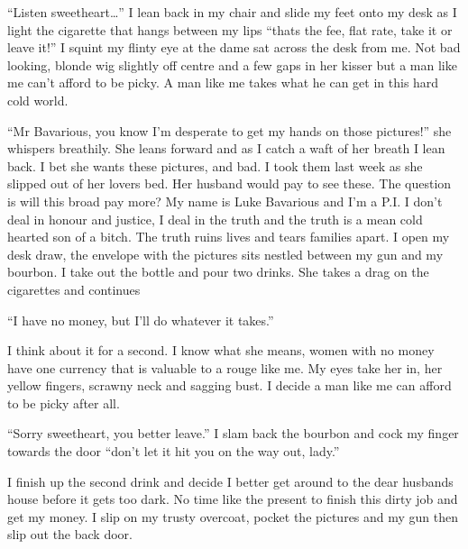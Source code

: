 ``Listen sweetheart{\ldots}'' I lean back in my chair and slide my feet
onto my desk as I light the cigarette that hangs between my lips
``thats the fee, flat rate, take it or leave it!'' I squint my flinty
eye at the dame sat across the desk from me. Not bad looking,
blonde wig slightly off centre and a few gaps in her kisser but a
man like me can't afford to be picky. A man like me takes what he
can get in this hard cold world.

``Mr Bavarious, you know I'm desperate to get my hands on those
pictures!'' she whispers breathily. She leans forward and as I catch
a waft of her breath I lean back. I bet she wants these pictures,
and bad. I took them last week as she slipped out of her lovers
bed. Her husband would pay to see these. The question is will this
broad pay more? My name is Luke Bavarious and I'm a P.I. I don't
deal in honour and justice, I deal in the truth and the truth is a
mean cold hearted son of a bitch. The truth ruins lives and tears
families apart. I open my desk draw, the envelope with the pictures
sits nestled between my gun and my bourbon. I take out the bottle
and pour two drinks. She takes a drag on the cigarettes and
continues

``I have no money, but I'll do whatever it takes.''

I think about it for a second. I know what she means, women with no
money have one currency that is valuable to a rouge like me. My
eyes take her in, her yellow fingers, scrawny neck and sagging
bust. I decide a man like me can afford to be picky after
all.

``Sorry sweetheart, you better leave.'' I slam back the bourbon and
cock my finger towards the door ``don't let it hit you on the way
out, lady.''



I finish up the second drink and decide I better get around to the
dear husbands house before it gets too dark. No time like the
present to finish this dirty job and get my money. I slip on my
trusty overcoat, pocket the pictures and my gun then slip out the
back door.



